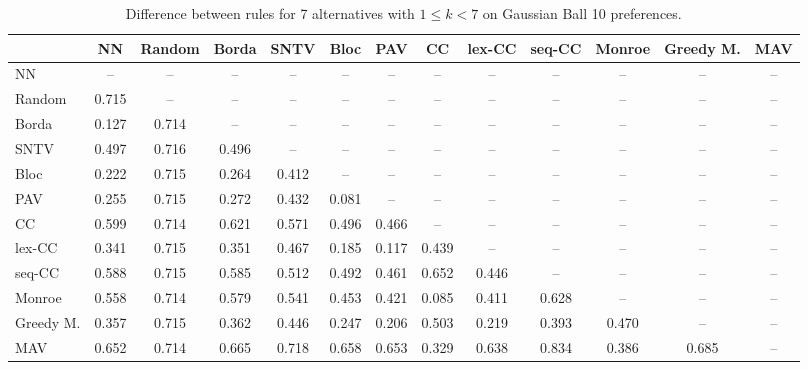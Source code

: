 
\begin{table*}[htbp]
\centering
\begin{tabular}{lcccccccccccc}
\toprule
 & NN & Random & Borda & SNTV & Bloc & PAV & CC & lex-CC & seq-CC & Monroe & Greedy M. & MAV \\
\midrule
NN & -- & -- & -- & -- & -- & -- & -- & -- & -- & -- & -- & -- \\
Random & \cellcolor{blue!71} 0.715 & -- & -- & -- & -- & -- & -- & -- & -- & -- & -- & -- \\
Borda & \cellcolor{blue!12} 0.127 & \cellcolor{blue!71} 0.714 & -- & -- & -- & -- & -- & -- & -- & -- & -- & -- \\
SNTV & \cellcolor{blue!49} 0.497 & \cellcolor{blue!71} 0.716 & \cellcolor{blue!49} 0.496 & -- & -- & -- & -- & -- & -- & -- & -- & -- \\
Bloc & \cellcolor{blue!22} 0.222 & \cellcolor{blue!71} 0.715 & \cellcolor{blue!26} 0.264 & \cellcolor{blue!41} 0.412 & -- & -- & -- & -- & -- & -- & -- & -- \\
PAV & \cellcolor{blue!25} 0.255 & \cellcolor{blue!71} 0.715 & \cellcolor{blue!27} 0.272 & \cellcolor{blue!43} 0.432 & \cellcolor{blue!8} 0.081 & -- & -- & -- & -- & -- & -- & -- \\
CC & \cellcolor{blue!59} 0.599 & \cellcolor{blue!71} 0.714 & \cellcolor{blue!62} 0.621 & \cellcolor{blue!57} 0.571 & \cellcolor{blue!49} 0.496 & \cellcolor{blue!46} 0.466 & -- & -- & -- & -- & -- & -- \\
lex-CC & \cellcolor{blue!34} 0.341 & \cellcolor{blue!71} 0.715 & \cellcolor{blue!35} 0.351 & \cellcolor{blue!46} 0.467 & \cellcolor{blue!18} 0.185 & \cellcolor{blue!11} 0.117 & \cellcolor{blue!43} 0.439 & -- & -- & -- & -- & -- \\
seq-CC & \cellcolor{blue!58} 0.588 & \cellcolor{blue!71} 0.715 & \cellcolor{blue!58} 0.585 & \cellcolor{blue!51} 0.512 & \cellcolor{blue!49} 0.492 & \cellcolor{blue!46} 0.461 & \cellcolor{blue!65} 0.652 & \cellcolor{blue!44} 0.446 & -- & -- & -- & -- \\
Monroe & \cellcolor{blue!55} 0.558 & \cellcolor{blue!71} 0.714 & \cellcolor{blue!57} 0.579 & \cellcolor{blue!54} 0.541 & \cellcolor{blue!45} 0.453 & \cellcolor{blue!42} 0.421 & \cellcolor{blue!8} 0.085 & \cellcolor{blue!41} 0.411 & \cellcolor{blue!62} 0.628 & -- & -- & -- \\
Greedy M. & \cellcolor{blue!35} 0.357 & \cellcolor{blue!71} 0.715 & \cellcolor{blue!36} 0.362 & \cellcolor{blue!44} 0.446 & \cellcolor{blue!24} 0.247 & \cellcolor{blue!20} 0.206 & \cellcolor{blue!50} 0.503 & \cellcolor{blue!21} 0.219 & \cellcolor{blue!39} 0.393 & \cellcolor{blue!47} 0.470 & -- & -- \\
MAV & \cellcolor{blue!65} 0.652 & \cellcolor{blue!71} 0.714 & \cellcolor{blue!66} 0.665 & \cellcolor{blue!71} 0.718 & \cellcolor{blue!65} 0.658 & \cellcolor{blue!65} 0.653 & \cellcolor{blue!32} 0.329 & \cellcolor{blue!63} 0.638 & \cellcolor{blue!83} 0.834 & \cellcolor{blue!38} 0.386 & \cellcolor{blue!68} 0.685 & -- \\
\bottomrule
\end{tabular}

\caption{Difference between rules for 7 alternatives with $1 \leq k < 7$ on Gaussian Ball 10 preferences.}
\label{tab:rule_distance_heatmap-m=[7]-pref_dist=euclidean__args__dimensions=10_-_space=gaussian_ball}
\end{table*}
    
